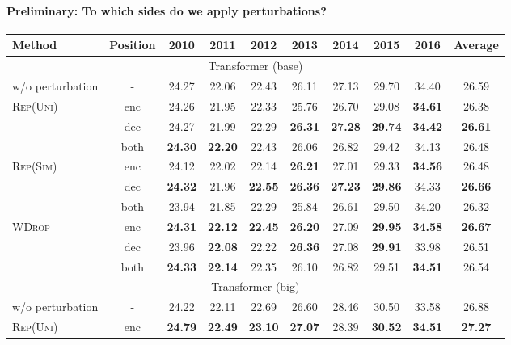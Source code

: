 \documentclass[11pt]{article}
\newcommand{\uniform}{\textsc{Rep(Uni)}}
\newcommand{\similarity}{\textsc{Rep(Sim)}}
\newcommand{\worddrop}{\textsc{WDrop}}
\begin{document}
\paragraph{Preliminary: To which sides do we apply perturbations?}
\begin{table*}[!t]
  \centering
  \footnotesize
  \begin{tabular}{ l | c | c c c c c c c | c } \hline
  Method & Position & 2010 & 2011 & 2012 & 2013 & 2014 & 2015 & 2016 & Average \\ \hline \hline
  \multicolumn{10}{c}{Transformer (base)} \\ \hline \hline
  w/o perturbation & - & 24.27 & 22.06 & 22.43 & 26.11 & 27.13 & 29.70 & 34.40 & 26.59 \\ \hline
  \multirow{3}{*}{\uniform{}} & enc & 24.26 & 21.95 & 22.33 & 25.76 & 26.70 & 29.08 & \textbf{34.61} & 26.38 \\
  & dec & 24.27 & 21.99 & 22.29 & \textbf{26.31} & \textbf{27.28} & \textbf{29.74} & \textbf{34.42} & \textbf{26.61} \\
  & both & \textbf{24.30} & \textbf{22.20} & 22.43 & 26.06 & 26.82 & 29.42 & 34.13 & 26.48 \\ \hline
  \multirow{3}{*}{\similarity{}} & enc & 24.12 & 22.02 & 22.14 & \textbf{26.21} & 27.01 & 29.33 & \textbf{34.56} & 26.48\\
  & dec & \textbf{24.32} & 21.96 & \textbf{22.55} & \textbf{26.36} & \textbf{27.23} & \textbf{29.86} & 34.33 & \textbf{26.66} \\
  & both & 23.94 & 21.85 & 22.29 & 25.84 & 26.61 & 29.50 & 34.20 & 26.32 \\ \hline
  \multirow{3}{*}{\worddrop{}} & enc & \textbf{24.31} & \textbf{22.12} & \textbf{22.45} & \textbf{26.20} & 27.09 & \textbf{29.95} & \textbf{34.58} & \textbf{26.67} \\
  & dec & 23.96 & \textbf{22.08} & 22.22 & \textbf{26.36} & 27.08 & \textbf{29.91} & 33.98 & 26.51 \\
  & both & \textbf{24.33} & \textbf{22.14} & 22.35 & 26.10 & 26.82 & 29.51 & \textbf{34.51} & 26.54 \\ \hline \hline
  \multicolumn{10}{c}{Transformer (big)} \\ \hline \hline 
  w/o perturbation & - & 24.22 & 22.11 & 22.69 & 26.60 & 28.46 & 30.50 & 33.58 & 26.88 \\ \hline
  \multirow{3}{*}{\uniform{}} & enc &  \textbf{24.79} & \textbf{22.49} & \textbf{23.10} & \textbf{27.07} & 28.39 & \textbf{30.52} & \textbf{34.51} & \textbf{27.27} \\

\end{tabular}
\end{table*}
\end{document}
